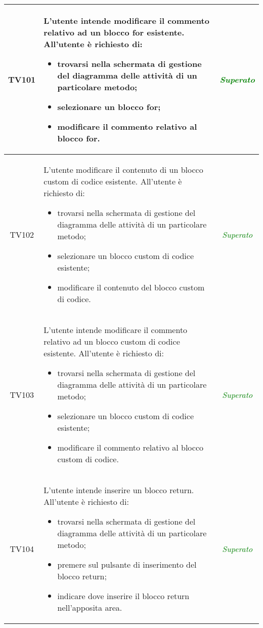 \begin{longtable}{|c|>{}m{8cm}|c|}
\hypertarget{TV4.24.4}{TV101} & L'utente intende modificare il commento relativo ad un blocco for esistente.
All'utente è richiesto di:
\begin{itemize}
	\item trovarsi nella schermata di gestione del diagramma delle attività di un particolare metodo;
	\item selezionare un blocco for;
	\item modificare il commento relativo al blocco for.
\end{itemize} & \textcolor{Green}{\textit{Superato}}\\ \hline

\hypertarget{TV4.25.1}{TV102} & L'utente modificare il contenuto di un blocco custom di codice esistente.
All'utente è richiesto di:
\begin{itemize}
	\item trovarsi nella schermata di gestione del diagramma delle attività di un particolare metodo;
	\item selezionare un blocco custom di codice esistente;
	\item modificare il contenuto del blocco custom di codice.
\end{itemize} & \textcolor{Green}{\textit{Superato}}\\ \hline

\hypertarget{TV4.25.2}{TV103} & L'utente intende modificare il commento relativo ad un blocco custom di codice esistente.
All'utente è richiesto di:
\begin{itemize}
	\item trovarsi nella schermata di gestione del diagramma delle attività di un particolare metodo;
	\item selezionare un blocco custom di codice esistente;
	\item modificare il commento relativo al blocco custom di codice.
\end{itemize} & \textcolor{Green}{\textit{Superato}}\\ \hline

\hypertarget{TV4.26}{TV104} & L'utente intende inserire un blocco return.
All'utente è richiesto di:
\begin{itemize}
	\item trovarsi nella schermata di gestione del diagramma delle attività di un particolare metodo;
	\item premere sul pulsante di inserimento del blocco return;
	\item indicare dove inserire il blocco return nell'apposita area.
\end{itemize} & \textcolor{Green}{\textit{Superato}}\\ \hline


\end{longtable}

